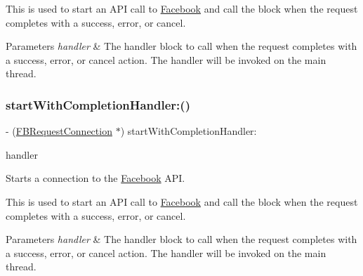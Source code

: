 This is used to start an A\+PI call to \hyperlink{interfaceFacebook}{Facebook} and call the block when the request completes with a success, error, or cancel.


\begin{DoxyParams}{Parameters}
{\em handler} & The handler block to call when the request completes with a success, error, or cancel action. The handler will be invoked on the main thread. \\
\hline
\end{DoxyParams}
\mbox{\label{interfaceFBRequest_a40af16a9b68d4e08abd9e022b94df6f0}} 
\subsubsection{\texorpdfstring{start\+With\+Completion\+Handler\+:()}{startWithCompletionHandler:()}\hspace{0.1cm}{\footnotesize\ttfamily [4/5]}}
{\footnotesize\ttfamily -\/ (\hyperlink{interfaceFBRequestConnection}{F\+B\+Request\+Connection} $\ast$) start\+With\+Completion\+Handler\+: \begin{DoxyParamCaption}\item[{(F\+B\+Request\+Handler)}]{handler }\end{DoxyParamCaption}}

Starts a connection to the \hyperlink{interfaceFacebook}{Facebook} A\+PI.

This is used to start an A\+PI call to \hyperlink{interfaceFacebook}{Facebook} and call the block when the request completes with a success, error, or cancel.


\begin{DoxyParams}{Parameters}
{\em handler} & The handler block to call when the request completes with a success, error, or cancel action. The handler will be invoked on the main thread. \\
\hline
\end{DoxyParams}
\mbox{\label{interfaceFBRequest_a40af16a9b68d4e08abd9e022b94df6f0}} 
